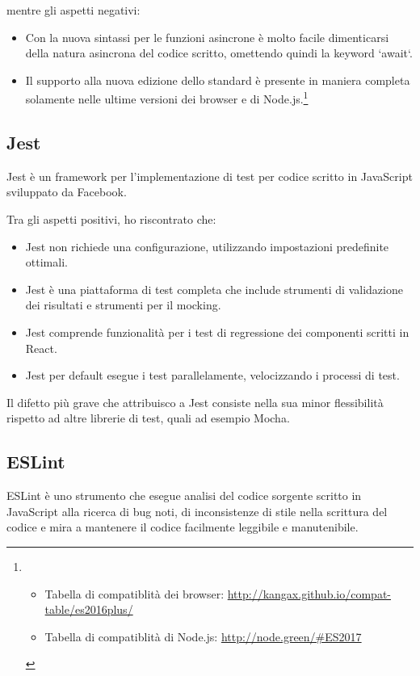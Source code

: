 mentre gli aspetti negativi:
\begin{itemize}
	\item Con la nuova sintassi per le funzioni asincrone è molto facile dimenticarsi della natura asincrona del codice scritto, omettendo quindi la keyword `await`.
	\item Il supporto alla nuova edizione dello standard è presente in maniera completa solamente nelle ultime versioni dei browser e di Node.js.\footnote{\begin{itemize}
		\item Tabella di compatiblità dei browser: \href{http://kangax.github.io/compat-table/es2016plus/}{http://kangax.github.io/compat-table/es2016plus/} 
		\item Tabella di compatiblità di Node.js: \href{http://node.green/#ES2017}{http://node.green/#ES2017}
	\end{itemize}}
\end{itemize}

\subsection{Jest}

Jest è un framework per l'implementazione di test per codice scritto in JavaScript sviluppato da Facebook.

Tra gli aspetti positivi, ho riscontrato che:
\begin{itemize}
	\item Jest non richiede una configurazione, utilizzando impostazioni predefinite ottimali.
	\item Jest è una piattaforma di test completa che include strumenti di validazione dei risultati e  strumenti per il mocking.
	\item Jest comprende funzionalità per i test di regressione dei componenti scritti in React.
	\item Jest per default esegue i test parallelamente, velocizzando i processi di test.
\end{itemize}

Il difetto più grave che attribuisco a Jest consiste nella sua minor flessibilità rispetto ad altre librerie di test, quali ad esempio Mocha.

\subsection{ESLint}

ESLint è uno strumento che esegue analisi del codice sorgente scritto in JavaScript alla ricerca di bug noti, di inconsistenze di stile nella scrittura del codice e mira a mantenere il codice facilmente leggibile e manutenibile.


